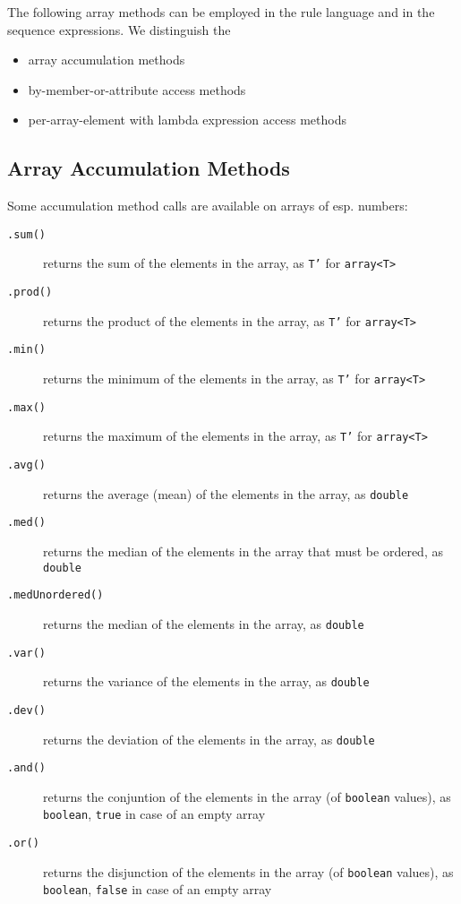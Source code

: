 The following array methods can be employed in the rule language and in the sequence expressions.
We distinguish the 
\begin{itemize}
	\item array accumulation methods
	\item by-member-or-attribute access methods
	\item per-array-element with lambda expression access methods
\end{itemize}

\subsection{Array Accumulation Methods} 

Some accumulation method calls are available on arrays of esp. numbers:

\begin{description}
\item[\texttt{.sum()}] returns the sum of the elements in the array, as \texttt{T'} for \texttt{array<T>}
\item[\texttt{.prod()}] returns the product of the elements in the array, as \texttt{T'} for \texttt{array<T>}
\item[\texttt{.min()}] returns the minimum of the elements in the array, as \texttt{T'} for \texttt{array<T>}
\item[\texttt{.max()}] returns the maximum of the elements in the array, as \texttt{T'} for \texttt{array<T>}
\item[\texttt{.avg()}] returns the average (mean) of the elements in the array, as \texttt{double}
\item[\texttt{.med()}] returns the median of the elements in the array that must be ordered, as \texttt{double}
\item[\texttt{.medUnordered()}] returns the median of the elements in the array, as \texttt{double}
\item[\texttt{.var()}] returns the variance of the elements in the array, as \texttt{double}
\item[\texttt{.dev()}] returns the deviation of the elements in the array, as \texttt{double}
\item[\texttt{.and()}] returns the conjuntion of the elements in the array (of \texttt{boolean} values), as \texttt{boolean}, \texttt{true} in case of an empty array
\item[\texttt{.or()}] returns the disjunction of the elements in the array (of \texttt{boolean} values), as \texttt{boolean}, \texttt{false} in case of an empty array
\end{description}\label{arrayaccumulationmethod}

